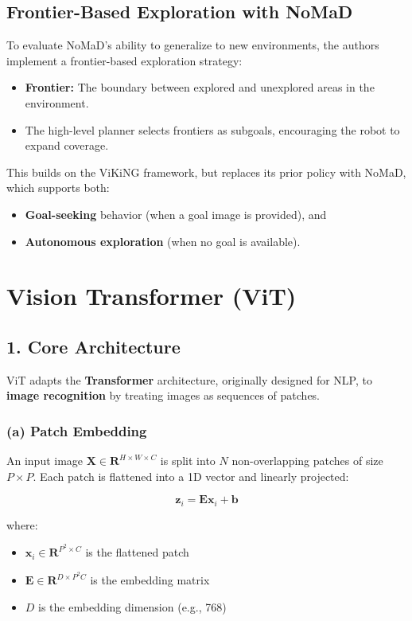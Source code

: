 \documentclass[12pt]{article}
\begin{document}
\begin{appendices}
\subsection*{Frontier-Based Exploration with NoMaD}
To evaluate NoMaD's ability to generalize to new environments, the authors implement a frontier-based exploration strategy:
\begin{itemize} 
    \item \textbf{Frontier:} The boundary between explored and unexplored areas in the environment. 
    \item The high-level planner selects frontiers as subgoals, encouraging the robot to expand coverage. 
\end{itemize}
This builds on the ViKiNG framework, but replaces its prior policy with NoMaD, which supports both: 
\begin{itemize} 
    \item \textbf{Goal-seeking} behavior (when a goal image is provided), and 
    \item \textbf{Autonomous exploration} (when no goal is available). 
\end{itemize}


\section{Vision Transformer (ViT)}
\label{app:vit}

\subsection*{1. Core Architecture}
ViT adapts the \textbf{Transformer} architecture, originally designed for NLP, to \textbf{image recognition} by treating images as sequences of patches.

\subsubsection*{(a) Patch Embedding}
An input image $\mathbf{X} \in \mathbf{R}^{H \times W \times C}$ is split into $N$ non-overlapping patches of size $P \times P$. Each patch is flattened into a 1D vector and linearly projected:

\[
\mathbf{z}_i = \mathbf{E} \mathbf{x}_i + \mathbf{b}
\]

where:
\begin{itemize}
    \item $\mathbf{x}_i \in \mathbf{R}^{P^2 \times C}$ is the flattened patch
    \item $\mathbf{E} \in \mathbf{R}^{D \times P^2 C}$ is the embedding matrix
    \item $D$ is the embedding dimension (e.g., 768)
\end{itemize}


\end{appendices}
\end{document}
